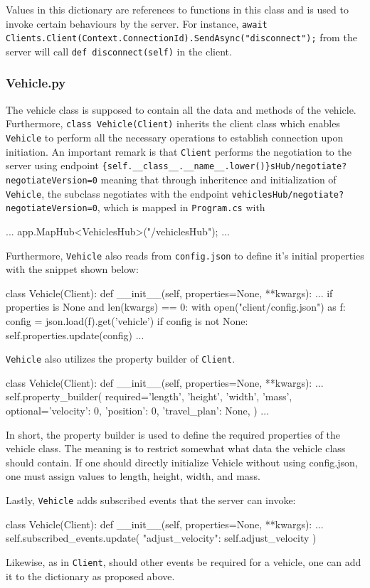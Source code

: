 Values in this dictionary are references to functions in this class and is used to invoke certain behaviours by the server. For instance, \newline\verb|await Clients.Client(Context.ConnectionId).SendAsync("disconnect");| from the server will call \verb|def disconnect(self)| in the client. 

\subsubsection{Vehicle.py}
The vehicle class is supposed to contain all the data and methods of the vehicle. Furthermore, \verb|class Vehicle(Client)| inherits the client class which enables \verb|Vehicle| to perform all the necessary operations to establish connection upon initiation. An important remark is that \verb|Client| performs the negotiation to the server using endpoint \newline \verb|{self.__class__.__name__.lower()}sHub/negotiate?negotiateVersion=0| meaning that through inheritence and initialization of \verb|Vehicle|, the subclass negotiates with the endpoint  \verb|vehiclesHub/negotiate?negotiateVersion=0|, which is mapped in \verb|Program.cs| with
\begin{csharp}
...
app.MapHub<VehiclesHub>("/vehiclesHub");
...
\end{csharp}

Furthermore, \verb|Vehicle| also reads from \verb|config.json| to define it's initial properties with the snippet shown below:
\begin{python}
class Vehicle(Client):
	def __init__(self, properties=None, **kwargs):
		...
		if properties is None and len(kwargs) == 0:
			with open("client/config.json") as f:
				config = json.load(f).get('vehicle')
				if config is not None:
					self.properties.update(config)
		...
\end{python}

\verb|Vehicle| also utilizes the property builder of \verb|Client|.

\begin{python}
class Vehicle(Client):
	def __init__(self, properties=None, **kwargs):
		...
		self.property_builder(
			required={'length', 'height', 'width', 'mass'},
			optional={'velocity': 0, 'position': 0, 'travel_plan': None},
		)
		...
\end{python}

In short, the property builder is used to define the required properties of the vehicle class. The meaning is to restrict somewhat what data the vehicle class should contain. If one should directly initialize Vehicle without using config.json, one must assign values to length, height, width, and mass.

Lastly, \verb|Vehicle| adds subscribed events that the server can invoke:
\begin{python}
class Vehicle(Client):
	def __init__(self, properties=None, **kwargs):
		...
		self.subscribed_events.update({
			"adjust_velocity": self.adjust_velocity
		})
\end{python}

Likewise, as in \verb|Client|, should other events be required for a vehicle, one can add it to the dictionary as proposed above.